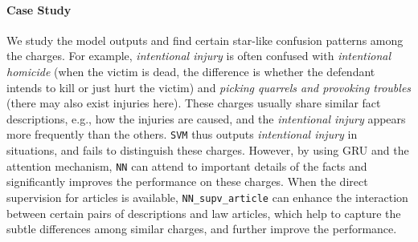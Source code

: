 




\paragraph{Case Study}
We study the model outputs and find certain star-like confusion patterns among the charges. For example, \emph{intentional injury} %
is often confused with %
\emph{intentional homicide} (when the victim is dead, the difference is %
 whether the defendant intends to kill  or just hurt the victim) and \emph{picking quarrels and provoking troubles}
(there may also exist injuries here).
These charges usually share similar fact descriptions, e.g., how the injuries are caused, and the \emph{intentional injury} appears more frequently than the others. \texttt{SVM} thus outputs \emph{intentional injury} in  situations, and fails to distinguish these charges.
However, by using GRU and the attention mechanism, \texttt{NN} can attend to important details of the facts and significantly improves the performance on these charges.
When the direct supervision for articles is available,  \texttt{NN\_supv\_article}  can enhance the interaction between certain pairs of descriptions and law articles, which help to capture the subtle differences among similar charges, and further improve the performance.

